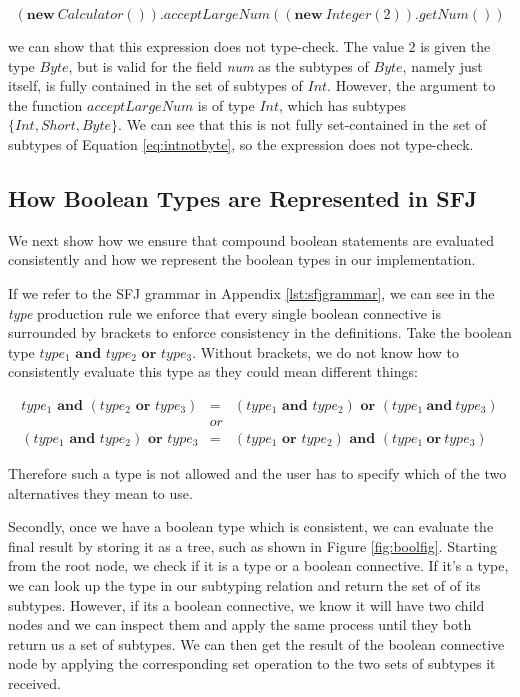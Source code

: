 \documentclass{l4proj}
\begin{document}
\begin{equation}
    (\textbf{new}\ Calculator()).acceptLargeNum((\textbf{new}\ Integer(2)).getNum())
\end{equation}

we can show that this expression does not type-check.
The value $2$ is given the type $Byte$, but is valid for the field \emph{num} as the subtypes of $Byte$, namely just itself, is fully contained in the set of subtypes of $Int$.
However, the argument to the function $acceptLargeNum$ is of type $Int$, which has subtypes $\{Int, Short, Byte\}$.
We can see that this is not fully set-contained in the set of subtypes of Equation \ref{eq:intnotbyte}, so the expression does not type-check.

\subsection{How Boolean Types are Represented in SFJ}

We next show how we ensure that compound boolean statements are evaluated consistently and how we represent the boolean types in our implementation.

If we refer to the SFJ grammar in Appendix \ref{lst:sfjgrammar}, we can see in the \emph{type} production rule we enforce that every single boolean connective is surrounded by brackets to enforce consistency in the definitions.
Take the boolean type $type_{1} \textbf{ and } type_{2} \textbf{ or } type_{3}$.
Without brackets, we do not know how to consistently evaluate this type as they could mean different things:

\begin{equation}
    \begin{array}{llll}
        type_{1} \textbf{ and } (type_{2} \textbf{ or } type_{3}) & =  & (type_{1} \textbf{ and } type_{2}) \textbf{ or } (type_{1}\ \textbf{and} \ type_{3})
        \\
                                                                  & or &
        \\
        (type_{1} \textbf{ and } type_{2}) \textbf{ or } type_{3} & =  & (type_{1} \textbf{ or } type_{2}) \textbf{ and } (type_{1}\ \textbf{or} \ type_{3})
    \end{array}
\end{equation}

Therefore such a type is not allowed and the user has to specify which of the two alternatives they mean to use.

Secondly, once we have a boolean type which is consistent, we can evaluate the final result by storing it as a tree, such as shown in Figure \ref{fig:boolfig}.
Starting from the root node, we check if it is a type or a boolean connective.
If it's a type, we can look up the type in our subtyping relation and return the set of of its subtypes.
However, if its a boolean connective, we know it will have two child nodes and we can inspect them  and apply the same process until they both return us a set of subtypes.
We can then get the result of the boolean connective node by applying the corresponding set operation to the two sets of subtypes it received.
\end{document}
